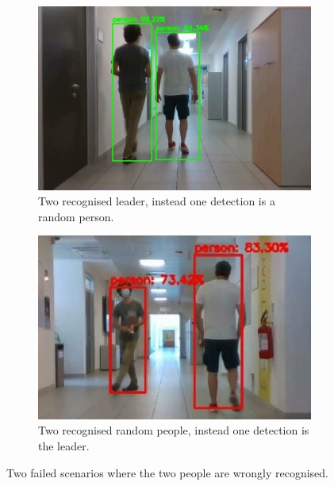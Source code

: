\begin{figure}[!h]
	\centering
	\begin{subfigure}[!h]{0.49\textwidth}
		\includegraphics[width=1\linewidth]{images/solution/leaderSubjectDoubleMatch}
		\captionsetup{margin=0.2cm}
		\caption{Two recognised leader, instead one detection is a random person.}
		\label{fig:leaderSubjectDoubleMatch}
	\end{subfigure}
	\begin{subfigure}[!h]{0.49\textwidth}
		\includegraphics[width=1\linewidth]{images/solution/leaderSubjectDoubleFail}
		\captionsetup{margin=0.2cm}
		\caption{Two recognised random people, instead one detection is the leader.}
		\label{fig:leaderSubjectDoubleFail}
	\end{subfigure}
	\captionsetup{margin=0.5cm}
	\caption{Two failed scenarios where the two people are wrongly recognised.}
	\label{fig:qqq}
\end{figure}

